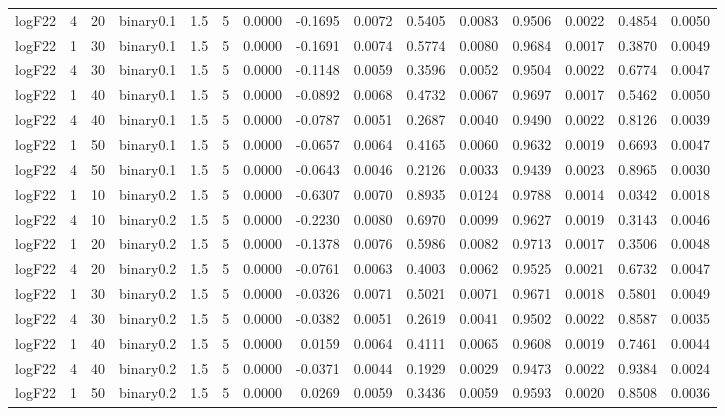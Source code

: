 \begin{longtable}{rrrrrrrrrrrrrrr}
  logF22 & 4 & 20 & binary0.1 & 1.5 & 5 & 0.0000 & -0.1695 & 0.0072 & 0.5405 & 0.0083 & 0.9506 & 0.0022 & 0.4854 & 0.0050 \\ 
  logF22 & 1 & 30 & binary0.1 & 1.5 & 5 & 0.0000 & -0.1691 & 0.0074 & 0.5774 & 0.0080 & 0.9684 & 0.0017 & 0.3870 & 0.0049 \\ 
  logF22 & 4 & 30 & binary0.1 & 1.5 & 5 & 0.0000 & -0.1148 & 0.0059 & 0.3596 & 0.0052 & 0.9504 & 0.0022 & 0.6774 & 0.0047 \\ 
  logF22 & 1 & 40 & binary0.1 & 1.5 & 5 & 0.0000 & -0.0892 & 0.0068 & 0.4732 & 0.0067 & 0.9697 & 0.0017 & 0.5462 & 0.0050 \\ 
  logF22 & 4 & 40 & binary0.1 & 1.5 & 5 & 0.0000 & -0.0787 & 0.0051 & 0.2687 & 0.0040 & 0.9490 & 0.0022 & 0.8126 & 0.0039 \\ 
  logF22 & 1 & 50 & binary0.1 & 1.5 & 5 & 0.0000 & -0.0657 & 0.0064 & 0.4165 & 0.0060 & 0.9632 & 0.0019 & 0.6693 & 0.0047 \\ 
  logF22 & 4 & 50 & binary0.1 & 1.5 & 5 & 0.0000 & -0.0643 & 0.0046 & 0.2126 & 0.0033 & 0.9439 & 0.0023 & 0.8965 & 0.0030 \\ 
  logF22 & 1 & 10 & binary0.2 & 1.5 & 5 & 0.0000 & -0.6307 & 0.0070 & 0.8935 & 0.0124 & 0.9788 & 0.0014 & 0.0342 & 0.0018 \\ 
  logF22 & 4 & 10 & binary0.2 & 1.5 & 5 & 0.0000 & -0.2230 & 0.0080 & 0.6970 & 0.0099 & 0.9627 & 0.0019 & 0.3143 & 0.0046 \\ 
  logF22 & 1 & 20 & binary0.2 & 1.5 & 5 & 0.0000 & -0.1378 & 0.0076 & 0.5986 & 0.0082 & 0.9713 & 0.0017 & 0.3506 & 0.0048 \\ 
  logF22 & 4 & 20 & binary0.2 & 1.5 & 5 & 0.0000 & -0.0761 & 0.0063 & 0.4003 & 0.0062 & 0.9525 & 0.0021 & 0.6732 & 0.0047 \\ 
  logF22 & 1 & 30 & binary0.2 & 1.5 & 5 & 0.0000 & -0.0326 & 0.0071 & 0.5021 & 0.0071 & 0.9671 & 0.0018 & 0.5801 & 0.0049 \\ 
  logF22 & 4 & 30 & binary0.2 & 1.5 & 5 & 0.0000 & -0.0382 & 0.0051 & 0.2619 & 0.0041 & 0.9502 & 0.0022 & 0.8587 & 0.0035 \\ 
  logF22 & 1 & 40 & binary0.2 & 1.5 & 5 & 0.0000 & 0.0159 & 0.0064 & 0.4111 & 0.0065 & 0.9608 & 0.0019 & 0.7461 & 0.0044 \\ 
  logF22 & 4 & 40 & binary0.2 & 1.5 & 5 & 0.0000 & -0.0371 & 0.0044 & 0.1929 & 0.0029 & 0.9473 & 0.0022 & 0.9384 & 0.0024 \\ 
  logF22 & 1 & 50 & binary0.2 & 1.5 & 5 & 0.0000 & 0.0269 & 0.0059 & 0.3436 & 0.0059 & 0.9593 & 0.0020 & 0.8508 & 0.0036 \\ 

\end{longtable}
